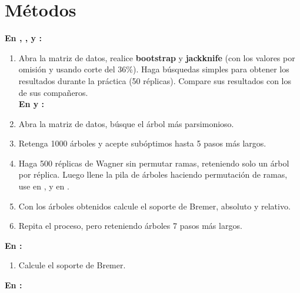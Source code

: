 \section{M\'etodos}
\noindent
\textbf{En , ,  y :}\\
\begin{enumerate}
\item  Abra la matriz de datos, realice \textbf{bootstrap} y \textbf{jackknife} (con los valores por omisi\'on y usando corte del 36\%). Haga b\'usquedas simples para obtener los resultados durante la pr\'actica (50 r\'eplicas). Compare sus resultados con los de sus compa\~neros.\\
\textbf{En  y :}\\
\item Abra la matriz de datos, b\'usque el \'arbol m\'as parsimonioso.\\
\item Retenga 1000 \'arboles y acepte sub\'optimos hasta  5 pasos m\'as largos. 
\item Haga 500 r\'eplicas de Wagner sin permutar ramas, reteniendo solo un \'arbol por r\'eplica. Luego llene la pila de \'arboles haciendo permutaci\'on de ramas, use  en , y en  .\\
\item Con los \'arboles obtenidos calcule el soporte de Bremer, absoluto y relativo.\\
\item Repita el proceso, pero reteniendo \'arboles 7 pasos m\'as largos.\\
\end{enumerate}
\textbf{En :}\\
\begin{enumerate}
\item Calcule el soporte de Bremer.\\
\end{enumerate}
\textbf{En :}\\
